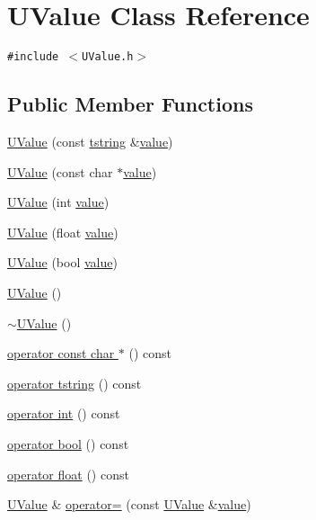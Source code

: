 \hypertarget{class_u_value}{
\section{UValue Class Reference}
\label{class_u_value}
}
{\tt \#include $<$UValue.h$>$}

\subsection*{Public Member Functions}
\begin{CompactItemize}
\item 
\hyperlink{class_u_value_c0a4bfe947980cb74ad336454c30f7c0}{UValue} (const \hyperlink{common__afx_8h_816fa58fd77499b0edb2c69ebe803d5c}{tstring} \&\hyperlink{glext__bak_8h_6a4f8a1a444e9080b297963b3db29fe0}{value})
\item 
\hyperlink{class_u_value_87fe93c363d158376139a5c1fc04fb90}{UValue} (const char $\ast$\hyperlink{glext__bak_8h_6a4f8a1a444e9080b297963b3db29fe0}{value})
\item 
\hyperlink{class_u_value_21b92c2b01558e7f05d7295e27405743}{UValue} (int \hyperlink{glext__bak_8h_6a4f8a1a444e9080b297963b3db29fe0}{value})
\item 
\hyperlink{class_u_value_04e29a0afddf2126d156249d7879e82a}{UValue} (float \hyperlink{glext__bak_8h_6a4f8a1a444e9080b297963b3db29fe0}{value})
\item 
\hyperlink{class_u_value_c636dcb8f6a524eb22d26f59e05d49c4}{UValue} (bool \hyperlink{glext__bak_8h_6a4f8a1a444e9080b297963b3db29fe0}{value})
\item 
\hyperlink{class_u_value_701470f74bf0f27de71cd6485c192393}{UValue} ()
\item 
\hyperlink{class_u_value_715559362386081f5f5f4c58926d62e2}{$\sim$UValue} ()
\item 
\hyperlink{class_u_value_e61e120c9e85ef30bfec09df24db3341}{operator const char $\ast$} () const 
\item 
\hyperlink{class_u_value_c1730254a5d60be8b9d754a17cbc2819}{operator tstring} () const 
\item 
\hyperlink{class_u_value_85746656d71d222e3439a42d2f2ca49d}{operator int} () const 
\item 
\hyperlink{class_u_value_ad603d2607c6c215d65edce90f7de42e}{operator bool} () const 
\item 
\hyperlink{class_u_value_4636a4aa31f5ced96ed7952aaa123062}{operator float} () const 
\item 
\hyperlink{class_u_value}{UValue} \& \hyperlink{class_u_value_869829cbcc11ae6324b9e57de53669e6}{operator=} (const \hyperlink{class_u_value}{UValue} \&\hyperlink{glext__bak_8h_6a4f8a1a444e9080b297963b3db29fe0}{value})

\end{CompactItemize}
